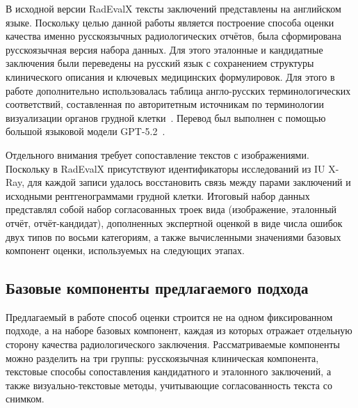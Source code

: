 В исходной версии RadEvalX тексты заключений представлены на английском языке. Поскольку целью данной работы является построение способа оценки качества именно русскоязычных радиологических отчётов, была сформирована русскоязычная версия набора данных. Для этого эталонные и кандидатные заключения были переведены на русский язык с сохранением структуры клинического описания и ключевых медицинских формулировок. Для этого в работе дополнительно использовалась таблица англо-русских терминологических соответствий, составленная по авторитетным источникам по терминологии визуализации органов грудной     клетки~\cite{fleischner_glossary,t35_chest_terms}. Перевод был выполнен с помощью большой языковой модели GPT-5.2~\cite{openai-gpt52}.

Отдельного внимания требует сопоставление текстов с изображениями. Поскольку в RadEvalX присутствуют идентификаторы исследований из IU X-Ray, для каждой записи удалось восстановить связь между парами заключений и исходными рентгенограммами грудной клетки. Итоговый набор данных представлял собой набор согласованных троек вида (изображение, эталонный отчёт, отчёт-кандидат), дополненных экспертной оценкой в виде числа ошибок двух типов по восьми категориям, а также вычисленными значениями базовых компонент оценки, используемых на следующих этапах.

\subsection{Базовые компоненты предлагаемого подхода}

Предлагаемый в работе способ оценки строится не на одном фиксированном подходе, а на наборе базовых компонент, каждая из которых отражает отдельную сторону качества радиологического заключения. Рассматриваемые компоненты можно разделить на три группы: русскоязычная клиническая компонента, текстовые способы сопоставления кандидатного и эталонного заключений, а также визуально-текстовые методы, учитывающие согласованность текста со снимком.

